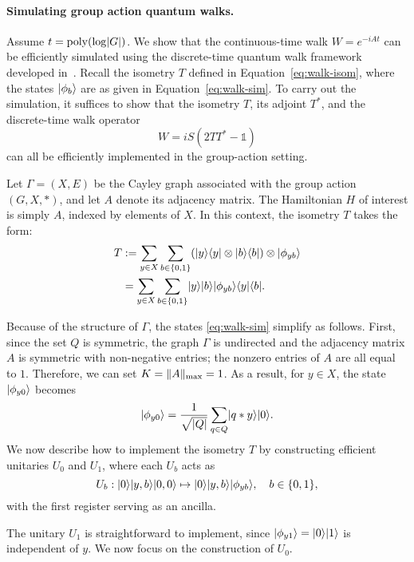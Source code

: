 \documentclass[11pt]{article}
\theoremstyle{definition}
\begin{document}

    
\paragraph{Simulating group action quantum walks.}
Assume \( t = \operatorname{poly}(\log \lvert G\rvert) \). We show that the continuous-time walk \( W = e^{-iAt} \) can be efficiently simulated using the discrete-time quantum walk framework developed in~\cite{childs2010relationship, berry2015hamiltonian}. Recall the isometry \( T \) defined in Equation~\eqref{eq:walk-isom}, where the states \( \lvert\phi_b\rangle \) are as given in Equation~\eqref{eq:walk-sim}. To carry out the simulation, it suffices to show that the isometry \( T \), its adjoint \( T^* \), and the discrete-time walk operator
\[
W = iS(2TT^* - \mathds{1})
\]
can all be efficiently implemented in the group-action setting.

Let \( \Gamma = (X, E) \) be the Cayley graph associated with the group action \( (G, X, *) \), and let \( A \) denote its adjacency matrix. The Hamiltonian \( H \) of interest is simply \( A \), indexed by elements of \( X \). In this context, the isometry \( T \) takes the form:
\begin{align*}
T
& := \sum_{y \in X} \sum_{b \in \{0, 1\}} (\lvert y\rangle\langle y\rvert \otimes \lvert b\rangle\langle b\rvert) \otimes \lvert\phi_{yb}\rangle \\
& = \sum_{y \in X} \sum_{b \in \{0, 1\}} \lvert y\rangle \lvert b\rangle \lvert\phi_{yb}\rangle \langle y\rvert \langle b\rvert.
\end{align*}


Because of the structure of $\Gamma$, the states \eqref{eq:walk-sim} simplify as follows. First, since the set $Q$ is symmetric, the graph $\Gamma$ is undirected and the adjacency matrix $A$ is symmetric with non-negative entries; the nonzero entries of $A$ are all equal to $1$. Therefore, we can set $K = \lVert A\rVert_{\mathrm{max}} = 1$. As a result, for $y \in X$, the state $\lvert\phi_{y0}\rangle$ becomes
\[ \lvert\phi_{y0}\rangle = \frac{1}{\sqrt{\lvert Q\rvert}} \sum_{q \in Q} \lvert q * y\rangle \lvert0\rangle. \]
We now describe how to implement the isometry \( T \) by constructing efficient unitaries \( U_0 \) and \( U_1 \), where each \( U_b \) acts as
\[
U_b : \lvert0\rangle \lvert y, b\rangle \lvert0, 0\rangle \mapsto \lvert0\rangle \lvert y, b\rangle \lvert\phi_{yb}\rangle, \quad b \in \{0, 1\},
\]
with the first register serving as an ancilla.

The unitary \( U_1 \) is straightforward to implement, since \( \lvert\phi_{y1}\rangle = \lvert0\rangle \lvert1\rangle \) is independent of \( y \). We now focus on the construction of \( U_0 \).
\end{document}
